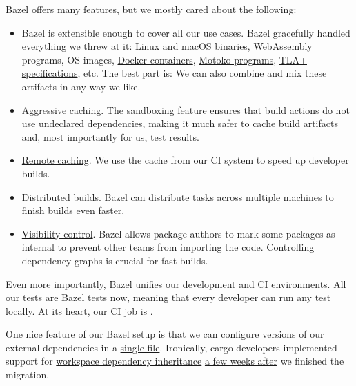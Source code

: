 \documentclass{article}
\begin{document}
Bazel offers many features, but we mostly cared about the following:
\begin{itemize}
  \item 
    Bazel is extensible enough to cover all our use cases.
    Bazel gracefully handled everything we threw at it: Linux and macOS binaries, WebAssembly programs, OS images, \href{https://github.com/bazelbuild/rules_docker}{Docker containers}, \href{https://github.com/dfinity/rules_motoko}{Motoko programs}, \href{https://lamport.azurewebsites.net/tla/tla.html}{TLA+ specifications}, etc.
    The best part is: We can also combine and mix these artifacts in any way we like.
  \item 
    Aggressive caching.
    The \href{https://bazel.build/docs/sandboxing}{sandboxing} feature ensures that build actions do not use undeclared dependencies, making it much safer to cache build artifacts and, most importantly for us, test results.
  \item 
    \href{https://bazel.build/remote/caching}{Remote caching}.
    We use the cache from our CI system to speed up developer builds.
  \item 
    \href{https://bazel.build/basics/distributed-builds}{Distributed builds}.
    Bazel can distribute tasks across multiple machines to finish builds even faster.
  \item 
    \href{https://bazel.build/concepts/visibility}{Visibility control}.
    Bazel allows package authors to mark some packages as internal to prevent other teams from importing the code.
    Controlling dependency graphs is crucial for fast builds.
\end{itemize}

Even more importantly, Bazel unifies our development and CI environments.
All our tests are Bazel tests now, meaning that every developer can run any test locally.
At its heart, our CI job is .

One nice feature of our Bazel setup is that we can configure versions of our external dependencies in a \href{https://github.com/dfinity/ic/blob/2d985cf8cf61dab9fd609ab589bd7e0990d4dbf2/bazel/external_crates.bzl}{single file}.
Ironically, cargo developers implemented support for \href{https://doc.rust-lang.org/cargo/reference/specifying-dependencies.html#inheriting-a-dependency-from-a-workspace}{workspace dependency inheritance} \href{https://blog.rust-lang.org/2022/09/22/Rust-1.64.0.html#cargo-improvements-workspace-inheritance-and-multi-target-builds}{a few weeks after} we finished the migration.
\end{document}
